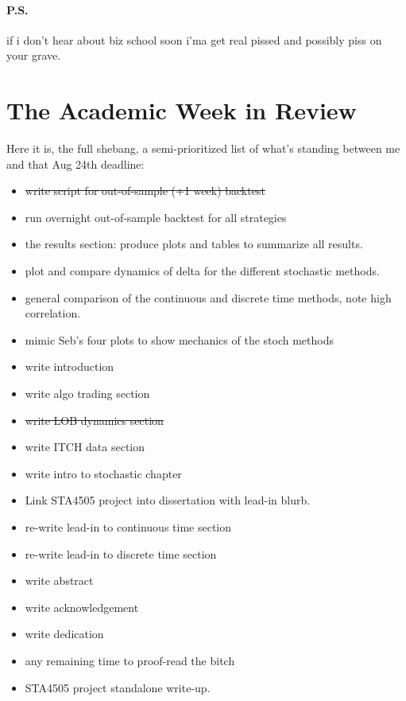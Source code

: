 \documentclass[12pt]{article}
\begin{document}
\paragraph{P.S.} if i don't hear about biz school soon i'ma get real pissed and possibly piss on your grave. 

\section*{The Academic Week in Review}
Here it is, the full shebang, a semi-prioritized list of what's standing between me and that Aug 24th deadline:

\begin{itemize}
\item \st{write script for out-of-sample (+1 week) backtest}
\item run overnight out-of-sample backtest for all strategies
\item the results section: produce plots and tables to summarize all results. 
\item plot and compare dynamics of delta for the different stochastic methods.
\item general comparison of the continuous and discrete time methods, note high correlation.
\item mimic Seb's four plots to show mechanics of the stoch methods
\item write introduction
\item write algo trading section
\item \st{write LOB dynamics section}
\item write ITCH data section
\item write intro to stochastic chapter
\item Link STA4505 project into dissertation with lead-in blurb.
\item re-write lead-in to continuous time section
\item re-write lead-in to discrete time section
\item write abstract
\item write acknowledgement
\item write dedication
\item any remaining time to proof-read the bitch
\item STA4505 project standalone write-up.
\end{itemize}
\end{document}
